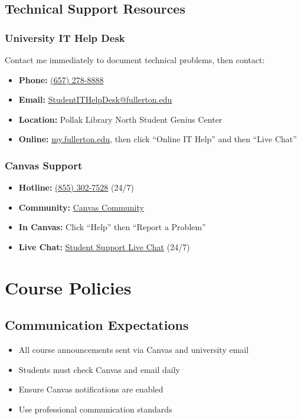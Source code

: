 \documentclass[12pt]{article}
\begin{document}
\subsection*{Technical Support Resources}

\subsubsection*{University IT Help Desk}
Contact me immediately to document technical problems, then contact:
\begin{itemize}
\item \textbf{Phone:} \href{tel:+16572788888}{(657) 278-8888}
\item \textbf{Email:} \href{mailto:StudentITHelpDesk@fullerton.edu}{StudentITHelpDesk@fullerton.edu}
\item \textbf{Location:} Pollak Library North Student Genius Center
\item \textbf{Online:} \href{http://my.fullerton.edu/}{my.fullerton.edu}, then click ``Online IT Help'' and then ``Live Chat''
\end{itemize}

\subsubsection*{Canvas Support}
\begin{itemize}
\item \textbf{Hotline:} \href{tel:+18553027528}{(855) 302-7528} (24/7)
\item \textbf{Community:} \href{https://community.canvaslms.com/docs/DOC-10720-67952720329}{Canvas Community}
\item \textbf{In Canvas:} Click ``Help'' then ``Report a Problem''
\item \textbf{Live Chat:} \href{https://cases.canvaslms.com/liveagentchat?chattype=student&sfid=001A000000YzcwQIAR}{Student Support Live Chat} (24/7)
\end{itemize}

\section*{Course Policies}

\subsection*{Communication Expectations}
\begin{itemize}
\item All course announcements sent via Canvas and university email
\item Students must check Canvas and email daily
\item Ensure Canvas notifications are enabled
\item Use professional communication standards
\end{itemize}
\end{document}
